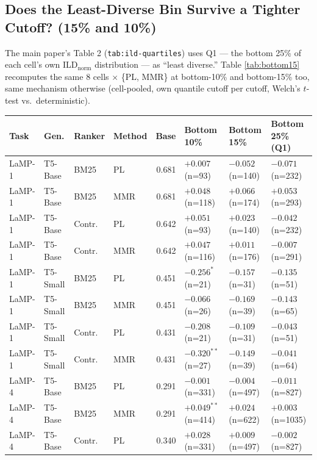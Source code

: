 \documentclass[10pt]{article}
\begin{document}
\FloatBarrier
\subsection{Does the Least-Diverse Bin Survive a Tighter Cutoff? (15\% and 10\%)}
\label{sec:bottom15}

The main paper's Table 2 (\texttt{tab:ild-quartiles}) uses Q1 --- the bottom 25\%
of each cell's own ILD$_{\text{norm}}$ distribution --- as ``least diverse.'' Table
\ref{tab:bottom15} recomputes the same 8 cells $\times$ \{PL, MMR\} at bottom-10\%
and bottom-15\% too, same mechanism otherwise (cell-pooled, own quantile cutoff per
cutoff, Welch's $t$-test vs.\ deterministic).

\begin{table}[h]
\centering
\scriptsize
\begin{tabular}{@{}llllrlll@{}}
\toprule
Task & Gen. & Ranker & Method & Base & Bottom 10\% & Bottom 15\% & Bottom 25\% (Q1) \\
\midrule
LaMP-1 & T5-Base & BM25 & PL & 0.681 & $+0.007$ (n{=}93) & $-0.052$ (n{=}140) & $-0.071$ (n{=}232) \\
LaMP-1 & T5-Base & BM25 & MMR & 0.681 & $+0.048$ (n{=}118) & $+0.066$ (n{=}174) & $+0.053$ (n{=}293) \\
LaMP-1 & T5-Base & Contr. & PL & 0.642 & $+0.051$ (n{=}93) & $+0.023$ (n{=}140) & $-0.042$ (n{=}232) \\
LaMP-1 & T5-Base & Contr. & MMR & 0.642 & $+0.047$ (n{=}116) & $+0.011$ (n{=}176) & $-0.007$ (n{=}291) \\
LaMP-1 & T5-Small & BM25 & PL & 0.451 & $-0.256^{*}$ (n{=}21) & $-0.157$ (n{=}31) & $-0.135$ (n{=}51) \\
LaMP-1 & T5-Small & BM25 & MMR & 0.451 & $-0.066$ (n{=}26) & $-0.169$ (n{=}39) & $-0.143$ (n{=}65) \\
LaMP-1 & T5-Small & Contr. & PL & 0.431 & $-0.208$ (n{=}21) & $-0.109$ (n{=}31) & $-0.043$ (n{=}51) \\
LaMP-1 & T5-Small & Contr. & MMR & 0.431 & $-0.320^{**}$ (n{=}27) & $-0.149$ (n{=}39) & $-0.041$ (n{=}64) \\
\addlinespace
LaMP-4 & T5-Base & BM25 & PL & 0.291 & $-0.001$ (n{=}331) & $-0.004$ (n{=}497) & $-0.011$ (n{=}827) \\
LaMP-4 & T5-Base & BM25 & MMR & 0.291 & $+0.049^{**}$ (n{=}414) & $+0.024$ (n{=}622) & $+0.003$ (n{=}1035) \\
LaMP-4 & T5-Base & Contr. & PL & 0.340 & $+0.028$ (n{=}331) & $+0.009$ (n{=}497) & $-0.002$ (n{=}827) \\

\end{tabular}
\end{table}
\end{document}

